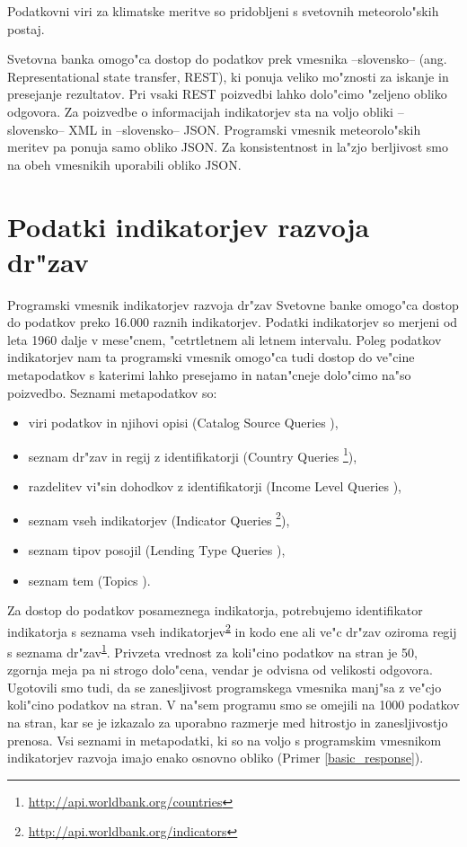Podatkovni viri za klimatske meritve so pridobljeni s svetovnih meteorolo"skih 
postaj.


Svetovna banka omogo"ca dostop do podatkov prek vmesnika --slovensko-- 
(ang. Representational state transfer, REST), ki ponuja 
veliko mo"znosti za iskanje in presejanje rezultatov. Pri vsaki REST poizvedbi
lahko dolo"cimo "zeljeno obliko odgovora. Za poizvedbe o informacijah 
indikatorjev sta na voljo obliki --slovensko-- XML in --slovensko-- JSON. 
Programski vmesnik meteorolo"skih
meritev pa ponuja samo obliko JSON. Za konsistentnost in la"zjo berljivost smo
na obeh vmesnikih uporabili obliko JSON. 


\section{Podatki indikatorjev razvoja dr"zav}



Programski vmesnik indikatorjev razvoja dr"zav Svetovne banke omogo"ca dostop
do podatkov preko 16.000 raznih indikatorjev. Podatki indikatorjev so merjeni
od leta 1960 dalje v mese"cnem, "cetrtletnem ali letnem intervalu. Poleg podatkov
indikatorjev nam ta programski vmesnik omogo"ca tudi dostop do ve"cine
metapodatkov s katerimi lahko presejamo in natan"cneje dolo"cimo na"so poizvedbo.
Seznami metapodatkov so:
\begin{itemize}
\item viri podatkov in njihovi opisi (Catalog Source Queries
	),
\item seznam dr"zav in regij z identifikatorji (Country Queries
	\footnote{\label{country_list}\url{http://api.worldbank.org/countries}}),
\item razdelitev vi"sin dohodkov z identifikatorji (Income Level Queries
	),
\item seznam vseh indikatorjev (Indicator Queries
    \footnote{\label{indicators_list}\url{http://api.worldbank.org/indicators}}),
\item seznam tipov posojil (Lending Type Queries
	),
\item seznam tem (Topics ).
\end{itemize}


Za dostop do podatkov posameznega indikatorja, potrebujemo identifikator
indikatorja s seznama vseh 
indikatorjev\textsuperscript{\ref{indicators_list}} in kodo ene ali ve"c
dr"zav oziroma regij s seznama 
dr"zav\textsuperscript{\ref{country_list}}. Privzeta vrednost za
koli"cino podatkov na stran je 50, zgornja meja pa ni strogo dolo"cena, vendar
je odvisna od velikosti odgovora. Ugotovili smo tudi, da se zanesljivost
programskega vmesnika manj"sa z ve"cjo koli"cino podatkov na stran. V na"sem 
programu smo se omejili na 1000 podatkov na stran, kar se je izkazalo za 
uporabno razmerje med hitrostjo in zanesljivostjo prenosa. Vsi seznami in 
metapodatki, ki so na voljo s programskim vmesnikom indikatorjev razvoja imajo
enako osnovno obliko (Primer \ref{basic_response}).


